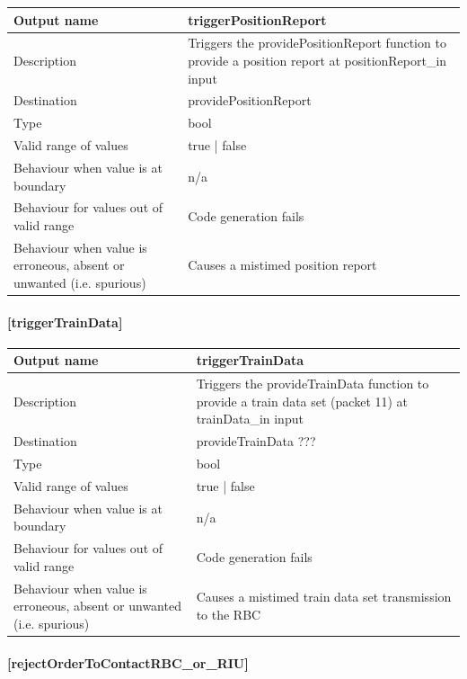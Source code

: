 \begin{longtable}{p{}p{}}
	\toprule
	Output name				& triggerPositionReport \\
	\midrule
	Description				& Triggers the providePositionReport function to provide a position report at positionReport\_in input \\
	\midrule
	Destination				& providePositionReport \\ 
	\midrule
	Type					& bool \\
	\midrule
	Valid range of values	& true | false \\
	\midrule
	Behaviour when value is at boundary	& n/a \\
	\midrule
	Behaviour for values out of valid range	& Code generation fails \\
	\midrule
	Behaviour when value is erroneous, absent or unwanted (i.e. spurious) & Causes a mistimed position report  \\
	\bottomrule
\end{longtable}


\paragraph{[triggerTrainData]}

\begin{longtable}{p{}p{}}
	\toprule
	Output name				& triggerTrainData \\
	\midrule
	Description				& Triggers the provideTrainData function to provide a train data set (packet 11) at trainData\_in input \\
	\midrule
	Destination				& provideTrainData ??? \\ 
	\midrule
	Type					& bool \\
	\midrule
	Valid range of values	& true | false \\
	\midrule
	Behaviour when value is at boundary	& n/a \\
	\midrule
	Behaviour for values out of valid range	& Code generation fails \\
	\midrule
	Behaviour when value is erroneous, absent or unwanted (i.e. spurious) & Causes a mistimed train data set transmission to the RBC \\
	\bottomrule
\end{longtable}

\paragraph{[rejectOrderToContactRBC\_or\_RIU]}

